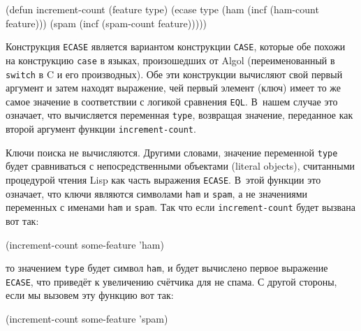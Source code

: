 \begin{myverb}
(defun increment-count (feature type)
  (ecase type
    (ham (incf (ham-count feature)))
    (spam (incf (spam-count feature)))))
\end{myverb}

Конструкция \lstinline{ECASE} является вариантом конструкции \lstinline{CASE}, которые обе похожи на
конструкцию \lstinline{case} в языках, произошедших от Algol (переименованный в \lstinline{switch} в
C и его производных).  Обе эти конструкции вычисляют свой первый аргумент и затем находят
выражение, чей первый элемент (ключ) имеет то же самое значение в соответствии с логикой
сравнения \lstinline{EQL}.  В~нашем случае это означает, что вычисляется переменная
\lstinline{type}, возвращая значение, переданное как второй аргумент функции
\lstinline{increment-count}.

Ключи поиска не вычисляются.  Другими словами, значение переменной \lstinline{type} будет
сравниваться с непосредственными объектами (literal objects), считанными процедурой чтения
Lisp как часть выражения \lstinline{ECASE}. В~этой функции это означает, что ключи являются
символами \lstinline{ham} и \lstinline{spam}, а не значениями переменных с именами \lstinline{ham} и
\lstinline{spam}.  Так что если \lstinline{increment-count} будет вызвана вот так:

\begin{myverb}
(increment-count some-feature 'ham)
\end{myverb}

\noindent{}то значением \lstinline{type} будет символ \lstinline{ham}, и будет вычислено первое выражение
\lstinline{ECASE}, что приведёт к увеличению счётчика для не спама. С другой стороны, если мы
вызовем эту функцию вот так:

\begin{myverb}
(increment-count some-feature 'spam)
\end{myverb}

